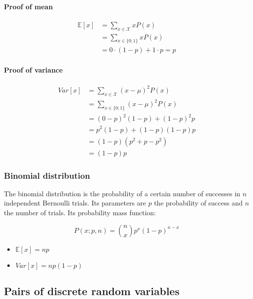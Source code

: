 		\begin{multicols}{2}
			\paragraph{Proof of mean}

			\begin{align*}
				\mathbb{E}[x] &= \sum\limits_{x\in\mathcal{X}} xP(x)\\
				      	& = \sum\limits_{x\in\{0;1\}}xP(x)\\
				      	&= 0\cdot(1-p) + 1\cdot p = p
			\end{align*}

			\paragraph{Proof of variance}

			\begin{align*}
				Var[x] &=\sum\limits_{x\in\mathcal{X}} (x-\mu)^2P(x)\\
			       	&=\sum\limits_{x\in\{0;1\}} (x-\mu)^2P(x)\\
			       	&=(0-p)^2(1-p)+(1-p)^2p\\
			       	&=p^2(1-p)+(1-p)(1-p)p\\
			       	&=(1-p)(p^2+p-p^2)\\
			       	&=(1-p)p
			\end{align*}
		\end{multicols}

		\subsubsection{Binomial distribution}
		The binomial distribution is the probability of a certain number of successes in $n$ independent Bernoulli trials.
		Its parameters are $p$ the probability of success and $n$ the number of trials.
		Its probability mass function:

		$$P(x;p,n) = \binom{n}{x}p^x(1-p)^{n-x}$$

		\begin{multicols}{2}
			\begin{itemize}
				\item $\mathbb{E}[x] = np$
				\item $Var[x] = np(1-p)$
			\end{itemize}
		\end{multicols}

	\subsection{Pairs of discrete random variables}


